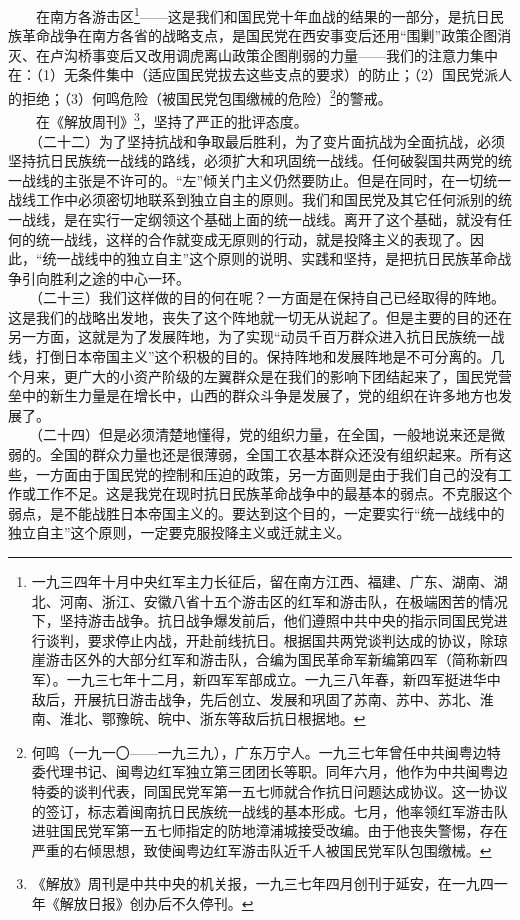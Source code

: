\documentclass[cn,11pt,chinese]{elegantbook}
\begin{document}
　　在南方各游击区\footnote[13]{ 一九三四年十月中央红军主力长征后，留在南方江西、福建、广东、湖南、湖北、河南、浙江、安徽八省十五个游击区的红军和游击队，在极端困苦的情况下，坚持游击战争。抗日战争爆发前后，他们遵照中共中央的指示同国民党进行谈判，要求停止内战，开赴前线抗日。根据国共两党谈判达成的协议，除琼崖游击区外的大部分红军和游击队，合编为国民革命军新编第四军（简称新四军）。一九三七年十二月，新四军军部成立。一九三八年春，新四军挺进华中敌后，开展抗日游击战争，先后创立、发展和巩固了苏南、苏中、苏北、淮南、淮北、鄂豫皖、皖中、浙东等敌后抗日根据地。}——这是我们和国民党十年血战的结果的一部分，是抗日民族革命战争在南方各省的战略支点，是国民党在西安事变后还用“围剿”政策企图消灭、在卢沟桥事变后又改用调虎离山政策企图削弱的力量——我们的注意力集中在：（1）无条件集中（适应国民党拔去这些支点的要求）的防止；（2）国民党派人的拒绝；（3）何鸣危险（被国民党包围缴械的危险）\footnote[14]{ 何鸣（一九一〇——一九三九），广东万宁人。一九三七年曾任中共闽粤边特委代理书记、闽粤边红军独立第三团团长等职。同年六月，他作为中共闽粤边特委的谈判代表，同国民党军第一五七师就合作抗日问题达成协议。这一协议的签订，标志着闽南抗日民族统一战线的基本形成。七月，他率领红军游击队进驻国民党军第一五七师指定的防地漳浦城接受改编。由于他丧失警惕，存在严重的右倾思想，致使闽粤边红军游击队近千人被国民党军队包围缴械。}的警戒。\\
　　在《解放周刊》\footnote[15]{ 《解放》周刊是中共中央的机关报，一九三七年四月创刊于延安，在一九四一年《解放日报》创办后不久停刊。}，坚持了严正的批评态度。\\
　　（二十二）为了坚持抗战和争取最后胜利，为了变片面抗战为全面抗战，必须坚持抗日民族统一战线的路线，必须扩大和巩固统一战线。任何破裂国共两党的统一战线的主张是不许可的。“左”倾关门主义仍然要防止。但是在同时，在一切统一战线工作中必须密切地联系到独立自主的原则。我们和国民党及其它任何派别的统一战线，是在实行一定纲领这个基础上面的统一战线。离开了这个基础，就没有任何的统一战线，这样的合作就变成无原则的行动，就是投降主义的表现了。因此，“统一战线中的独立自主”这个原则的说明、实践和坚持，是把抗日民族革命战争引向胜利之途的中心一环。\\
　　（二十三）我们这样做的目的何在呢？一方面是在保持自己已经取得的阵地。这是我们的战略出发地，丧失了这个阵地就一切无从说起了。但是主要的目的还在另一方面，这就是为了发展阵地，为了实现“动员千百万群众进入抗日民族统一战线，打倒日本帝国主义”这个积极的目的。保持阵地和发展阵地是不可分离的。几个月来，更广大的小资产阶级的左翼群众是在我们的影响下团结起来了，国民党营垒中的新生力量是在增长中，山西的群众斗争是发展了，党的组织在许多地方也发展了。\\
　　（二十四）但是必须清楚地懂得，党的组织力量，在全国，一般地说来还是微弱的。全国的群众力量也还是很薄弱，全国工农基本群众还没有组织起来。所有这些，一方面由于国民党的控制和压迫的政策，另一方面则是由于我们自己的没有工作或工作不足。这是我党在现时抗日民族革命战争中的最基本的弱点。不克服这个弱点，是不能战胜日本帝国主义的。要达到这个目的，一定要实行“统一战线中的独立自主”这个原则，一定要克服投降主义或迁就主义。\\
\end{document}
